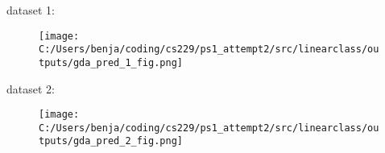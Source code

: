 %
%

\begin{answer}
	
	dataset 1:
	\begin{figure}[H]
		\texttt{[image: C:/Users/benja/coding/cs229/ps1\_attempt2/src/linearclass/outputs/gda\_pred\_1\_fig.png]}
	\end{figure}
	dataset 2:
	\begin{figure}[H]
		\texttt{[image: C:/Users/benja/coding/cs229/ps1\_attempt2/src/linearclass/outputs/gda\_pred\_2\_fig.png]}
	\end{figure}
\end{answer}

%

